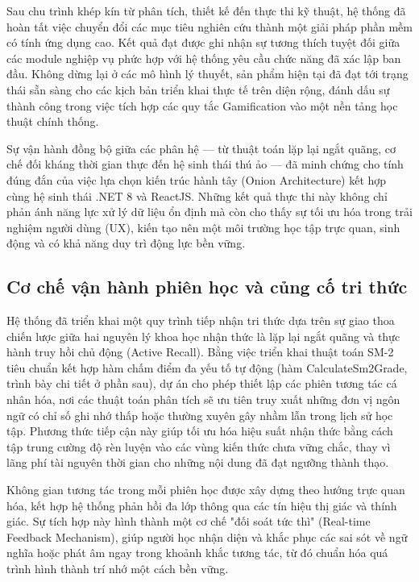 Sau chu trình khép kín từ phân tích, thiết kế đến thực thi kỹ thuật, hệ thống đã hoàn tất việc chuyển đổi các mục tiêu nghiên cứu thành một giải pháp phần mềm có tính ứng dụng cao. Kết quả đạt được ghi nhận sự tương thích tuyệt đối giữa các module nghiệp vụ phức hợp với hệ thống yêu cầu chức năng đã xác lập ban đầu. Không dừng lại ở các mô hình lý thuyết, sản phẩm hiện tại đã đạt tới trạng thái sẵn sàng cho các kịch bản triển khai thực tế trên diện rộng, đánh dấu sự thành công trong việc tích hợp các quy tắc Gamification vào một nền tảng học thuật chính thống.

Sự vận hành đồng bộ giữa các phân hệ — từ thuật toán lặp lại ngắt quãng, cơ chế đối kháng thời gian thực đến hệ sinh thái thú ảo — đã minh chứng cho tính đúng đắn của việc lựa chọn kiến trúc hành tây (Onion Architecture) kết hợp cùng hệ sinh thái .NET 8 và ReactJS. Những kết quả thực thi này không chỉ phản ánh năng lực xử lý dữ liệu ổn định mà còn cho thấy sự tối ưu hóa trong trải nghiệm người dùng (UX), kiến tạo nên một môi trường học tập trực quan, sinh động và có khả năng duy trì động lực bền vững.

\subsection{Cơ chế vận hành phiên học và củng cố tri thức}

Hệ thống đã triển khai một quy trình tiếp nhận tri thức dựa trên sự giao thoa chiến lược giữa hai nguyên lý khoa học nhận thức là lặp lại ngắt quãng và thực hành truy hồi chủ động (Active Recall). Bằng việc triển khai thuật toán SM-2 tiêu chuẩn kết hợp hàm chấm điểm đa yếu tố tự động (hàm CalculateSm2Grade, trình bày chi tiết ở phần sau), dự án cho phép thiết lập các phiên tương tác cá nhân hóa, nơi các thuật toán phân tích sẽ ưu tiên truy xuất những đơn vị ngôn ngữ có chỉ số ghi nhớ thấp hoặc thường xuyên gây nhầm lẫn trong lịch sử học tập. Phương thức tiếp cận này giúp tối ưu hóa hiệu suất nhận thức bằng cách tập trung cường độ rèn luyện vào các vùng kiến thức chưa vững chắc, thay vì lãng phí tài nguyên thời gian cho những nội dung đã đạt ngưỡng thành thạo.

Không gian tương tác trong mỗi phiên học được xây dựng theo hướng trực quan hóa, kết hợp hệ thống phản hồi đa lớp thông qua các tín hiệu thị giác và thính giác. Sự tích hợp này hình thành một cơ chế "đối soát tức thì" (Real-time Feedback Mechanism), giúp người học nhận diện và khắc phục các sai sót về ngữ nghĩa hoặc phát âm ngay trong khoảnh khắc tương tác, từ đó chuẩn hóa quá trình hình thành trí nhớ một cách bền vững.

